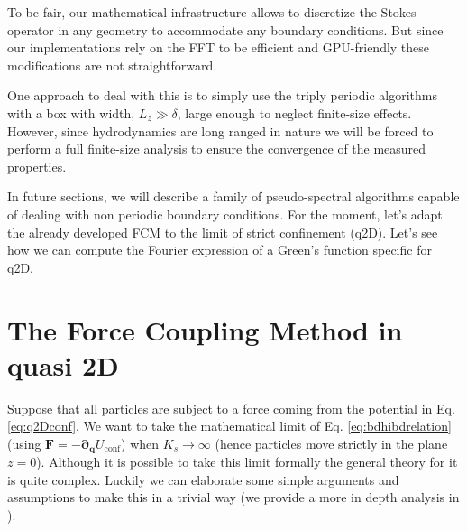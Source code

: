 \documentclass[ twoside,openright,titlepage,numbers=noenddot,%
headinclude,footinclude,cleardoublepage=empty,abstract=on,
BCOR=5mm,paper=b5,fontsize=11pt, dvipsnames
]{scrreprt}
\renewcommand{\vec}[1]{\bm{#1}}
\newcommand{\tens}[1]{\bm{\mathcal{#1}}}
\newcommand{\gpu}{\gls{GPU}\xspace}
\newcommand{\ppos}{q}
\begin{document}
To be fair, our mathematical infrastructure allows to discretize the Stokes operator in any geometry to accommodate any boundary conditions. But since our implementations rely on the \gls{FFT} to be efficient and \gpu-friendly these modifications are not straightforward. 

One approach to deal with this is to simply use the triply periodic algorithms with a box with width, $L_z\gg \delta$, large enough to neglect finite-size effects. However, since hydrodynamics are long ranged in nature we will be forced to perform a full finite-size analysis to ensure the convergence of the measured properties.

In future sections, we will describe a family of pseudo-spectral algorithms capable of dealing with non periodic boundary conditions. For the moment, let's adapt the already developed \gls{FCM} to the limit of strict confinement (q2D). Let's see how we can compute the Fourier expression of a Green's function specific for q2D.

\section{The Force Coupling Method in quasi 2D}

Suppose that all particles are subject to a force coming from the potential in Eq. \eqref{eq:q2Dconf}. We want to take the mathematical limit of Eq. \eqref{eq:bdhibdrelation} (using $\vec{F} = -\vec{\partial}_{\vec{\ppos}} U_{\text{conf}}$) when $K_s\rightarrow\infty$ (hence particles move strictly in the plane $z=0$). Although it is possible to take this limit formally the general theory for it is quite complex. Luckily we can elaborate some simple arguments and assumptions to make this in a trivial way (we provide a more in depth analysis in \cite{Pelaez2018}).

%
\end{document}
